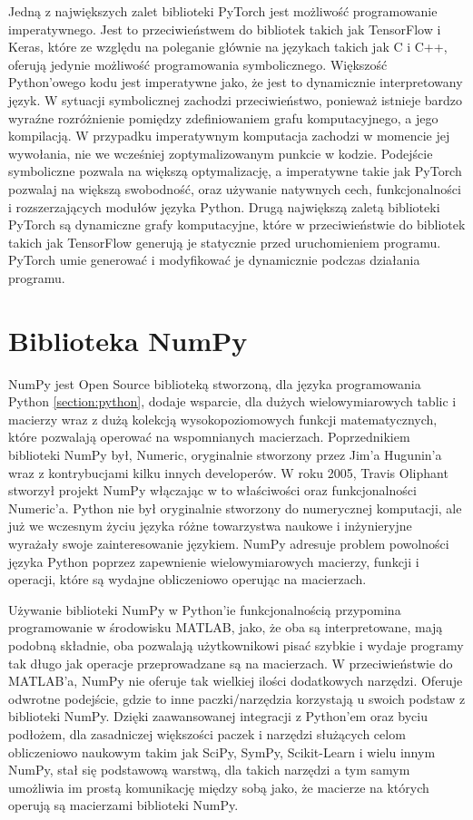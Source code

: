 Jedną z największych zalet biblioteki PyTorch jest możliwość programowanie imperatywnego. Jest to przeciwieństwem do bibliotek takich jak TensorFlow i Keras, które ze względu na poleganie głównie na językach takich jak C i C++, oferują jedynie możliwość programowania symbolicznego. Większość Python'owego kodu jest imperatywne jako, że jest to dynamicznie interpretowany język. W sytuacji symbolicznej zachodzi przeciwieństwo, ponieważ istnieje bardzo wyraźne rozróżnienie pomiędzy zdefiniowaniem grafu komputacyjnego, a jego kompilacją. W przypadku imperatywnym komputacja zachodzi w momencie jej wywołania, nie we wcześniej zoptymalizowanym punkcie w kodzie. Podejście symboliczne pozwala na większą optymalizację, a imperatywne takie jak PyTorch pozwalaj na większą swobodność, oraz używanie natywnych cech, funkcjonalności i rozszerzających modułów języka Python.
Drugą największą zaletą biblioteki PyTorch są dynamiczne grafy komputacyjne, które w przeciwieństwie do bibliotek takich jak TensorFlow generują je statycznie przed uruchomieniem programu. PyTorch umie generować i modyfikować je dynamicznie podczas działania programu.

\clearpage

\section{Biblioteka NumPy}
\label{section:numpy}
NumPy \cite{PythonForDataAnalysis} \cite{SciPyAndNumPy} \cite{NumPyManual} \cite{WikipediaNumPy} jest Open Source biblioteką stworzoną, dla języka programowania Python \ref{section:python}, dodaje wsparcie, dla dużych wielowymiarowych tablic i macierzy wraz z dużą kolekcją wysokopoziomowych funkcji matematycznych, które pozwalają operować na wspomnianych macierzach. Poprzednikiem biblioteki NumPy był, Numeric, oryginalnie stworzony przez Jim'a Hugunin'a wraz z kontrybucjami kilku innych developerów. W roku 2005, Travis Oliphant stworzył projekt NumPy włączając w to właściwości oraz funkcjonalności Numeric'a.
Python nie był oryginalnie stworzony do numerycznej komputacji, ale już we wczesnym życiu języka różne towarzystwa naukowe i inżynieryjne wyrażały swoje zainteresowanie językiem.
NumPy adresuje problem powolności języka Python poprzez zapewnienie wielowymiarowych macierzy, funkcji i operacji, które są wydajne obliczeniowo operując na macierzach.

Używanie biblioteki NumPy w Python'ie funkcjonalnością przypomina programowanie w środowisku MATLAB, jako, że oba są interpretowane, mają podobną składnie, oba pozwalają użytkownikowi pisać szybkie i wydaje programy tak długo jak operacje przeprowadzane są na macierzach. W przeciwieństwie do MATLAB'a, NumPy nie oferuje tak wielkiej ilości dodatkowych narzędzi. Oferuje odwrotne podejście, gdzie to inne paczki/narzędzia korzystają u swoich podstaw z biblioteki NumPy. Dzięki zaawansowanej integracji z Python'em oraz byciu podłożem, dla zasadniczej większości paczek i narzędzi służących celom obliczeniowo naukowym takim jak SciPy, SymPy, Scikit-Learn i wielu innym NumPy, stał się podstawową warstwą, dla takich narzędzi a tym samym umożliwia im prostą komunikację między sobą jako, że macierze na których operują są macierzami biblioteki NumPy.

